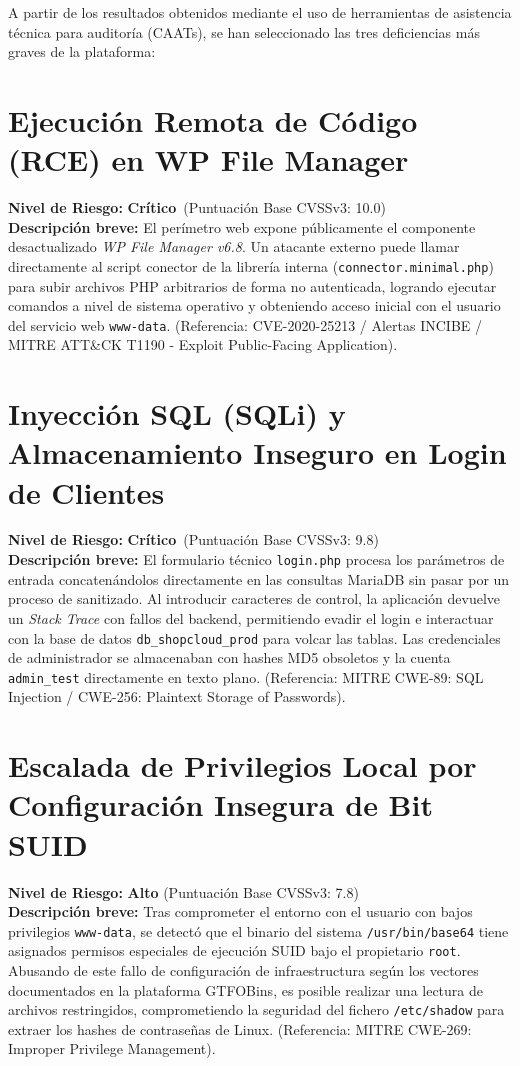 \documentclass[11pt,a4paper]{report}
\begin{document}
A partir de los resultados obtenidos mediante el uso de herramientas de asistencia técnica para auditoría (CAATs), se han seleccionado las tres deficiencias más graves de la plataforma:

\section{Ejecución Remota de Código (RCE) en WP File Manager}
\textbf{Nivel de Riesgo:} \color{critred}\textbf{Crítico}\color{black}\ (Puntuación Base CVSSv3: 10.0) \\
\textbf{Descripción breve:} El perímetro web expone públicamente el componente desactualizado \textit{WP File Manager v6.8}. Un atacante externo puede llamar directamente al script conector de la librería interna (\texttt{connector.minimal.php}) para subir archivos PHP arbitrarios de forma no autenticada, logrando ejecutar comandos a nivel de sistema operativo y obteniendo acceso inicial con el usuario del servicio web \texttt{www-data}. (Referencia: CVE-2020-25213 / Alertas INCIBE / MITRE ATT\&CK T1190 - Exploit Public-Facing Application).

\section{Inyección SQL (SQLi) y Almacenamiento Inseguro en Login de Clientes}
\textbf{Nivel de Riesgo:} \color{critred}\textbf{Crítico}\color{black}\ (Puntuación Base CVSSv3: 9.8) \\
\textbf{Descripción breve:} El formulario técnico \texttt{login.php} procesa los parámetros de entrada concatenándolos directamente en las consultas MariaDB sin pasar por un proceso de sanitizado. Al introducir caracteres de control, la aplicación devuelve un \textit{Stack Trace} con fallos del backend, permitiendo evadir el login e interactuar con la base de datos \texttt{db\_shopcloud\_prod} para volcar las tablas. Las credenciales de administrador se almacenaban con hashes MD5 obsoletos y la cuenta \texttt{admin\_test} directamente en texto plano. (Referencia: MITRE CWE-89: SQL Injection / CWE-256: Plaintext Storage of Passwords).

\section{Escalada de Privilegios Local por Configuración Insegura de Bit SUID}
\textbf{Nivel de Riesgo:} \textbf{Alto} (Puntuación Base CVSSv3: 7.8) \\
\textbf{Descripción breve:} Tras comprometer el entorno con el usuario con bajos privilegios \texttt{www-data}, se detectó que el binario del sistema \texttt{/usr/bin/base64} tiene asignados permisos especiales de ejecución SUID bajo el propietario \texttt{root}. Abusando de este fallo de configuración de infraestructura según los vectores documentados en la plataforma GTFOBins, es posible realizar una lectura de archivos restringidos, comprometiendo la seguridad del fichero \texttt{/etc/shadow} para extraer los hashes de contraseñas de Linux. (Referencia: MITRE CWE-269: Improper Privilege Management).
\end{document}
